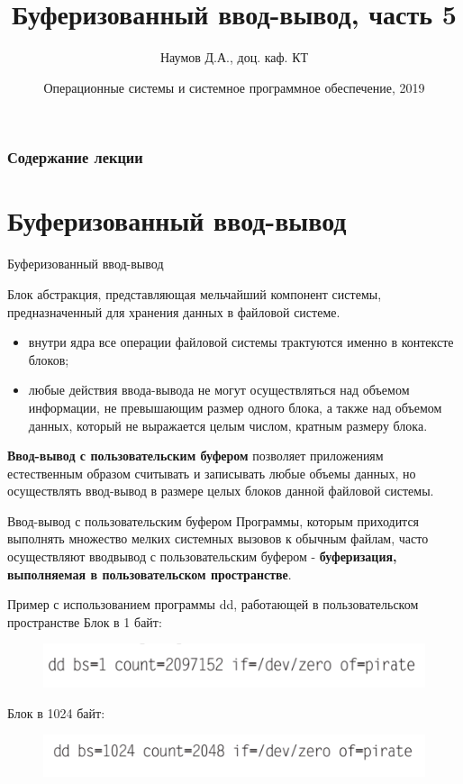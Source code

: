 \documentclass{beamer}
\title[Язык C]{Буферизованный ввод-вывод, часть 5}
\author{Наумов Д.А., доц. каф. КТ}
\date[25.09.2019] {Операционные системы и системное программное обеспечение, 2019}
\begin{document}
\begin{frame}
  \titlepage
\end{frame}
  
\begin{frame}
  \frametitle{Содержание лекции}
  \tableofcontents  
\end{frame}

\section{Буферизованный ввод-вывод}

\begin{frame}{Буферизованный ввод-вывод}
\begin{block}{Блок}
абстракция, представляющая мельчайший компонент системы, предназначенный для хранения данных в файловой системе.
\end{block}
\begin{itemize}
\item внутри ядра все операции файловой системы трактуются именно в контексте
блоков; 
\item любые действия ввода-вывода не могут осуществляться
над объемом информации, не превышающим размер одного блока, а также над
объемом данных, который не выражается целым числом, кратным размеру блока.
\end{itemize}
\textbf{Ввод-вывод с пользовательским буфером} позволяет
приложениям естественным образом считывать и записывать любые объемы
данных, но осуществлять ввод-вывод в размере целых блоков данной файловой
системы.
\end{frame}

\begin{frame}{Ввод-вывод с пользовательским буфером}
Программы, которым приходится выполнять множество мелких системных вызовов к обычным файлам, часто осуществляют ввод­вывод с пользовательским буфером - \textbf{буферизация, выполняемая в пользовательском пространстве}. 

\begin{block}{Пример с использованием программы dd, работающей в пользовательском пространстве}
Блок в 1 байт:
\begin{figure}[h]
\centering
\includegraphics[scale=0.6]{images/lec05-pic01.png}
\end{figure}
Блок в 1024 байт:
\begin{figure}[h]
\centering
\includegraphics[scale=0.6]{images/lec05-pic02.png}
\end{figure}
\end{block}
\end{frame}
\end{document}
